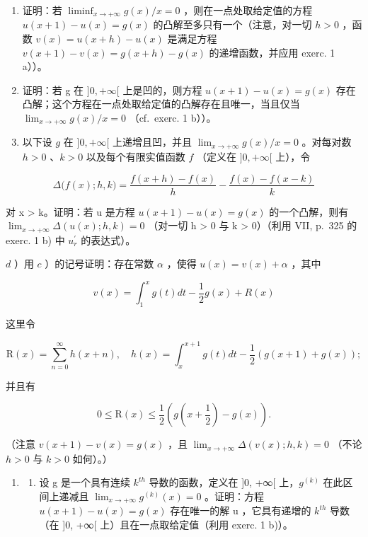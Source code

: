 \begin{enumerate}
\def\labelenumi{\alph{enumi})}
\item
  证明：若 \(\liminf_{x\to +\infty}g(x) / x = 0\) ，则在一点处取给定值的方程 \(u(x + 1) - u(x) = g(x)\) 的凸解至多只有一个（注意，对一切 \(h > 0\) ，函数 \(v(x) = u(x + h) - u(x)\) 是满足方程 \(v(x + 1) - v(x) = g(x + h) - g(x)\) 的递增函数，并应用 exerc. 1 a））。
\item
  证明：若 g 在 \(]0, +\infty[\) 上是凹的，则方程 \(u(x+1) - u(x) = g(x)\) 存在凸解；这个方程在一点处取给定值的凸解存在且唯一，当且仅当 \(\lim_{x \to +\infty} g(x)/x = 0\) （cf.~exerc. 1 b））。
\item
  以下设 \(g\) 在 \(]0, +\infty[\) 上递增且凹，并且 \(\lim_{x \to +\infty} g(x) / x = 0\) 。对每对数 \(h > 0\) 、\(k > 0\) 以及每个有限实值函数 \(f\) （定义在 \(]0, +\infty[\) 上），令
\end{enumerate}

\[
\varDelta \Big (f (x); h, k \Big) = \frac {f (x + h) - f (x)}{h} - \frac {f (x) - f (x - k)}{k}
\]

对 x \textgreater{} k。证明：若 u 是方程 \(u(x + 1) - u(x) = g(x)\) 的一个凸解，则有 \(\lim_{x \to +\infty} \Delta(u(x); h, k) = 0\) （对一切 h \textgreater{} 0 与 k \textgreater{} 0）（利用 VII, p.~325 的 exerc. 1 b) 中 \(u_{r}^{\prime}\) 的表达式）。

\(d\) ）用 \(c\) ）的记号证明：存在常数 \(\alpha\) ，使得 \(u(x) = v(x) + \alpha\) ，其中

\[
v (x) = \int_ {1} ^ {x} g (t) d t - \frac {1}{2} g (x) + R (x)
\]

这里令

\[
\mathrm{R} (x) = \sum_ {n = 0} ^ {\infty} h (x + n), \quad h (x) = \int_ {x} ^ {x + 1} g (t) d t - \frac {1}{2} (g (x + 1) + g (x));
\]

并且有

\[
0 \leqslant \mathrm{R} (x) \leqslant \frac {1}{2} (g (x + \frac {1}{2}) - g (x)).
\]

（注意 \(v(x + 1) - v(x) = g(x)\) ，且 \(\lim_{x\to +\infty}\Delta (v(x);h,k) = 0\) （不论 \(h > 0\) 与 \(k > 0\) 如何）。）

\begin{enumerate}
\def\labelenumi{\arabic{enumi})}
\setcounter{enumi}{2}
\tightlist
\item
  \begin{enumerate}
  \def\labelenumii{\alph{enumii})}
  \tightlist
  \item
    设 g 是一个具有连续 \(k^{th}\) 导数的函数，定义在 {]}0, +∞{[} 上，\(g^{(k)}\) 在此区间上递减且 \(\lim_{x\to+\infty}g^{(k)}(x)=0\) 。证明：方程 \(u(x+1)-u(x)=g(x)\) 存在唯一的解 u ，它具有递增的 \(k^{th}\) 导数（在 {]}0, +∞{[} 上）且在一点取给定值（利用 exerc. 1 b)）。
  \end{enumerate}
\end{enumerate}

